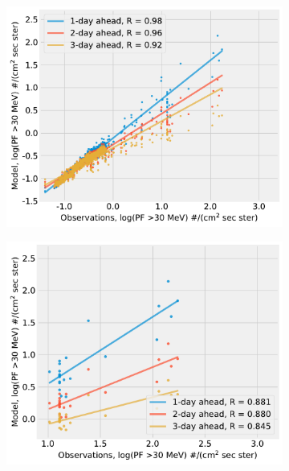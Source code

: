 \begin{figure}[!htp]
    \begin{subfigure}{0.4\textwidth}
         \centering
         \includegraphics[width=\textwidth]{chapter4/figs/scatterplot_obs_vs_model_tstset_3in1_log_PF30.pdf}
    \end{subfigure}
    \begin{subfigure}{0.4\textwidth}
         \centering
         \includegraphics[width=\textwidth]{chapter4/figs/scatterplot_obs_vs_model_tstset_3in1_LOG_PF_LT1_log_PF30.pdf}
    \end{subfigure}
    \begin{subfigure}{0.4\textwidth}

\end{subfigure}
\end{figure}
